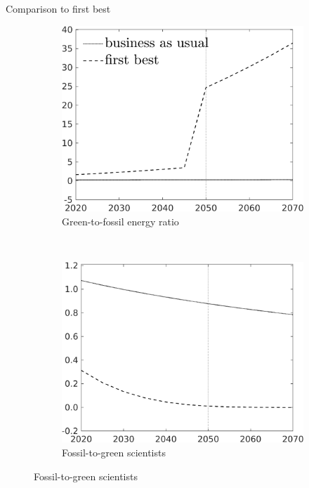 \documentclass[11pt,aspectratio=169]{beamer}
\begin{document}
\begin{frame}{Comparison to first best}
	
	\begin{figure}[h!!]
		\centering
		\begin{subfigure}{0.45\textwidth}		
			\caption{{Green-to-fossil energy ratio}}
			\includegraphics[width=1\textwidth]{../codding_model/own_basedOnFried/optimalPol_010922_revision/figures/all_13Sept22/NewCalib_effBAU_T_GFF_Sun2_emnet1_spillover0_knspil3_xgr0_nsk0_sep0_extern0_PV1_etaa0.79_lgd1.png}
		\end{subfigure}
		\begin{minipage}[]{0.05\textwidth}
			\
		\end{minipage}
		\begin{subfigure}{0.45\textwidth}		
			\caption{{Fossil-to-green scientists}}
			\includegraphics[width=1\textwidth]{../codding_model/own_basedOnFried/optimalPol_010922_revision/figures/all_13Sept22/NewCalib_effBAU_T_sffsg_Sun2_emnet1_spillover0_knspil3_xgr0_nsk0_sep0_extern0_PV1_etaa0.79_lgd0.png}

\end{subfigure}
\end{figure}
\end{frame}
\end{document}
